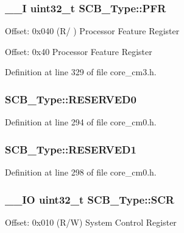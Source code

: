\hypertarget{struct_s_c_b___type_aeb36c109d2fdb4eb4d6c4dc29154d77f}{
\subsubsection[{P\-F\-R}]{\setlength{\rightskip}{0pt plus 5cm}\-\_\-\-\_\-\-I {\bf uint32\-\_\-t} S\-C\-B\-\_\-\-Type\-::\-P\-F\-R}}\label{struct_s_c_b___type_aeb36c109d2fdb4eb4d6c4dc29154d77f}
Offset\-: 0x040 (R/ ) Processor Feature Register

Offset\-: 0x40 Processor Feature Register 

Definition at line 329 of file core\-\_\-cm3.\-h.

\hypertarget{struct_s_c_b___type_a10960cdc703f661c83a237d9c69db23c}{
\subsubsection[{R\-E\-S\-E\-R\-V\-E\-D0}]{ S\-C\-B\-\_\-\-Type\-::\-R\-E\-S\-E\-R\-V\-E\-D0}}\label{struct_s_c_b___type_a10960cdc703f661c83a237d9c69db23c}


Definition at line 294 of file core\-\_\-cm0.\-h.

\hypertarget{struct_s_c_b___type_adddd65958c1c4c0301f62ede0a9bf12e}{
\subsubsection[{R\-E\-S\-E\-R\-V\-E\-D1}]{ S\-C\-B\-\_\-\-Type\-::\-R\-E\-S\-E\-R\-V\-E\-D1}}\label{struct_s_c_b___type_adddd65958c1c4c0301f62ede0a9bf12e}


Definition at line 298 of file core\-\_\-cm0.\-h.

\hypertarget{struct_s_c_b___type_abfad14e7b4534d73d329819625d77a16}{
\subsubsection[{S\-C\-R}]{\setlength{\rightskip}{0pt plus 5cm}\-\_\-\-\_\-\-I\-O {\bf uint32\-\_\-t} S\-C\-B\-\_\-\-Type\-::\-S\-C\-R}}\label{struct_s_c_b___type_abfad14e7b4534d73d329819625d77a16}
Offset\-: 0x010 (R/\-W) System Control Register

